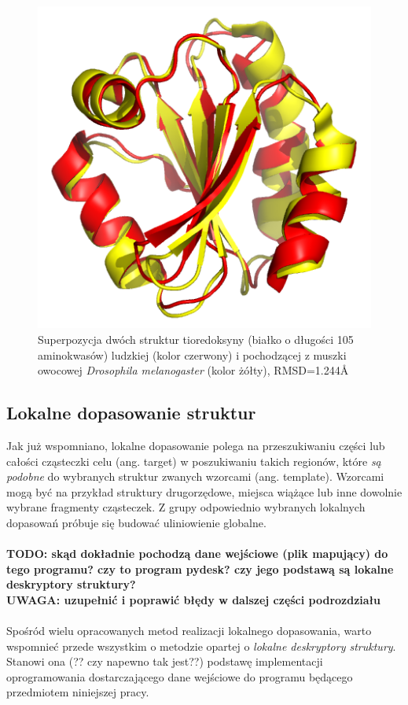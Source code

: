 \documentclass[licencjacka]{pracamgr}
\begin{document}
\begin{figure}[H]
\centering
\includegraphics[scale=0.7]{global_superposition}
\caption{Superpozycja dwóch struktur tioredoksyny (białko o długości 105 aminokwasów) ludzkiej (kolor czerwony) i pochodzącej z muszki owocowej \textit{Drosophila melanogaster} (kolor żółty), RMSD=1.244\AA }
\end{figure}

\subsection{Lokalne dopasowanie struktur} 
Jak już wspomniano, lokalne dopasowanie polega na przeszukiwaniu części lub całości cząsteczki celu (ang. target) w poszukiwaniu takich regionów, które \textit{są podobne} do wybranych struktur zwanych wzorcami (ang. template). Wzorcami mogą być na przykład struktury drugorzędowe, miejsca wiążące lub inne dowolnie wybrane fragmenty cząsteczek. Z grupy odpowiednio wybranych lokalnych dopasowań próbuje się budować uliniowienie globalne.
\\
\\
\textbf{TODO: skąd dokładnie pochodzą dane wejściowe (plik mapujący) do tego programu? czy to program pydesk? czy jego podstawą są lokalne deskryptory struktury? }
\\
\textbf{UWAGA: uzupełnić i poprawić błędy w dalszej części podrozdziału}
\\
\\
Spośród wielu opracowanych metod realizacji lokalnego dopasowania, warto wspomnieć przede wszystkim o metodzie opartej o \textit{lokalne deskryptory struktury}. Stanowi ona (?? czy napewno tak jest??) podstawę implementacji oprogramowania dostarczającego dane wejściowe do programu będącego przedmiotem niniejszej pracy. 
\end{document}
